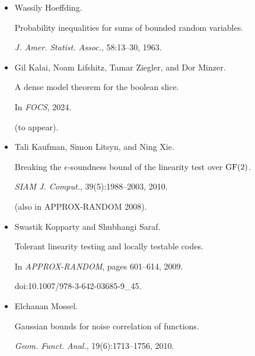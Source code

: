 \documentclass[10pt,a4paper]{article}
\begin{document}
\begin{itemize}
(also in APPROX-RANDOM 2003, 2005).


doi:10.1137/050645804.





\item[] 
[21]

Wassily Hoeffding.


Probability inequalities for sums of bounded random variables.


\emph{J. Amer. Statist. Assoc.}, 58:13–30, 1963.





\item[] 
[22]

Gil Kalai, Noam Lifshitz, Tamar Ziegler, and Dor Minzer.


A dense model theorem for the boolean slice.


In \emph{FOCS}, 2024.


(to appear).





\item[] 
[23]

Tali Kaufman, Simon Litsyn, and Ning Xie.


Breaking the $\epsilon$-soundness bound of the linearity test over
$\rm GF(2)$.


\emph{SIAM J. Comput.}, 39(5):1988–2003, 2010.


(also in APPROX-RANDOM 2008).





\item[] 
[24]

Swastik Kopparty and Shubhangi Saraf.


Tolerant linearity testing and locally testable codes.


In \emph{APPROX-RANDOM}, pages 601–614, 2009.


doi:10.1007/978-3-642-03685-9\_45.





\item[] 
[25]

Elchanan Mossel.


Gaussian bounds for noise correlation of functions.


\emph{Geom. Funct. Anal.}, 19(6):1713–1756, 2010.






\end{itemize}
\end{document}
